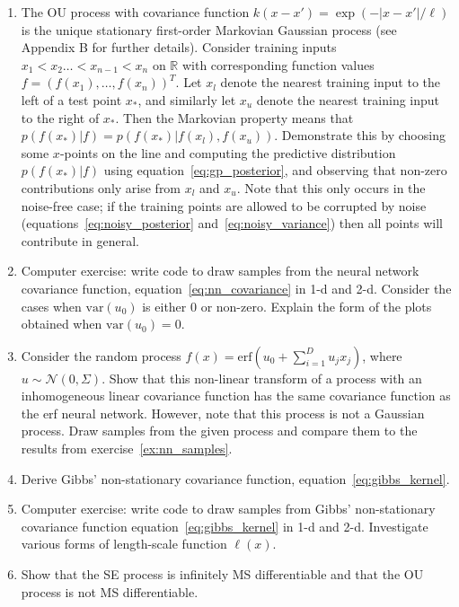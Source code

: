 \documentclass[11pt]{book}
\begin{document}
\begin{enumerate}
\item The OU process with covariance function $k(x - x') = \exp(-|x - x'|/\ell)$ is the unique stationary first-order Markovian Gaussian process (see Appendix B for further details). Consider training inputs $x_1 < x_2 \ldots < x_{n-1} < x_n$ on $\mathbb{R}$ with corresponding function values $f = (f(x_1), \ldots, f(x_n))^T$. Let $x_l$ denote the nearest training input to the left of a test point $x_*$, and similarly let $x_u$ denote the nearest training input to the right of $x_*$. Then the Markovian property means that $p(f(x_*)|f) = p(f(x_*)|f(x_l), f(x_u))$. Demonstrate this by choosing some $x$-points on the line and computing the predictive distribution $p(f(x_*)|f)$ using equation~\eqref{eq:gp_posterior}, and observing that non-zero contributions only arise from $x_l$ and $x_u$. Note that this only occurs in the noise-free case; if the training points are allowed to be corrupted by noise (equations~\eqref{eq:noisy_posterior} and~\eqref{eq:noisy_variance}) then all points will contribute in general.

\item Computer exercise: write code to draw samples from the neural network covariance function, equation~\eqref{eq:nn_covariance} in 1-d and 2-d. Consider the cases when $\text{var}(u_0)$ is either 0 or non-zero. Explain the form of the plots obtained when $\text{var}(u_0) = 0$.

\item Consider the random process $f(x) = \text{erf}(u_0 + \sum_{i=1}^D u_j x_j)$, where $u \sim \mathcal{N}(0, \Sigma)$. Show that this non-linear transform of a process with an inhomogeneous linear covariance function has the same covariance function as the erf neural network. However, note that this process is not a Gaussian process. Draw samples from the given process and compare them to the results from exercise~\ref{ex:nn_samples}.

\item \label{ex:gibbs_derive} Derive Gibbs' non-stationary covariance function, equation~\eqref{eq:gibbs_kernel}.

\item \label{ex:gibbs_compute} Computer exercise: write code to draw samples from Gibbs' non-stationary covariance function equation~\eqref{eq:gibbs_kernel} in 1-d and 2-d. Investigate various forms of length-scale function $\ell(x)$.

\item Show that the SE process is infinitely MS differentiable and that the OU process is not MS differentiable.


\end{enumerate}
\end{document}

